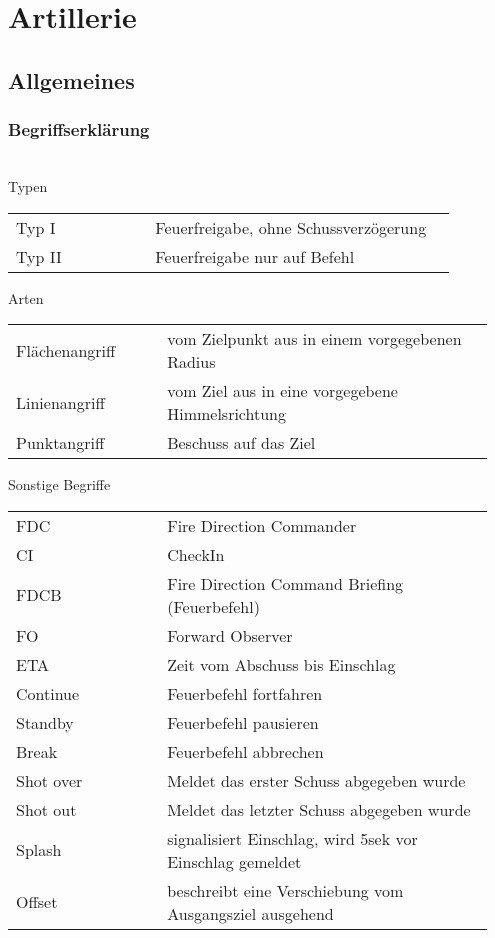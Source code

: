 \pagebreak
\section{Artillerie}
\subsection{Allgemeines}
\subsubsection{Begriffserklärung} \hfil\\
	Typen
	\begin{longtable}{p{0.3\linewidth} p{0.65\linewidth}}
		Typ I 		& 	Feuerfreigabe, ohne Schussverzögerung \\
		Typ II 		&	Feuerfreigabe nur auf Befehl \\
	\end{longtable}

	Arten
	\begin{longtable}{p{0.3\linewidth} p{0.65\linewidth}}
		Flächenangriff 	&	vom Zielpunkt aus in einem vorgegebenen Radius \\
		Linienangriff 	&	vom Ziel aus in eine vorgegebene Himmelsrichtung \\
		Punktangriff 	&	Beschuss auf das Ziel \\
	\end{longtable}

	Sonstige Begriffe

	\begin{longtable}{p{0.3\linewidth} p{0.65\linewidth}}
		FDC 		&		Fire Direction Commander \\
		CI  		&		CheckIn \\
		FDCB 		&		Fire Direction Command Briefing (Feuerbefehl) \\
		FO  		&		Forward Observer \\
		ETA  		&		Zeit vom Abschuss bis Einschlag \\
		Continue 	&		Feuerbefehl fortfahren \\
		Standby 	&		Feuerbefehl pausieren \\
		Break  		&		Feuerbefehl abbrechen \\
		Shot over  	&		Meldet das erster Schuss abgegeben wurde \\
		Shot out  	&		Meldet das letzter Schuss abgegeben wurde \\
		Splash  	&		signalisiert Einschlag, wird 5sek vor Einschlag gemeldet \\
		Offset  	&		beschreibt eine Verschiebung vom Ausgangsziel ausgehend \\
	\end{longtable}

